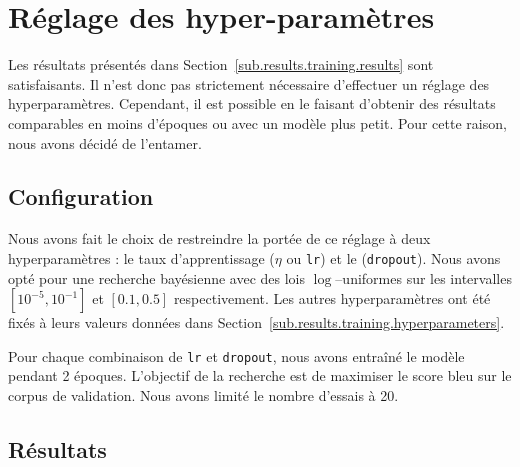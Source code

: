 \section{Réglage des hyper-paramètres}%
\label{sec.results.hparams}

Les résultats présentés dans Section~\ref{sub.results.training.results} sont satisfaisants.
Il n'est donc pas strictement nécessaire d'effectuer un réglage des hyperparamètres.
Cependant, il est possible en le faisant d'obtenir des résultats comparables 
en moins d'époques ou avec un modèle plus petit.
Pour cette raison, nous avons décidé de l'entamer.

\subsection{Configuration}%
\label{sub.results.hparams.config}

Nous avons fait le choix de restreindre la portée de ce réglage à deux hyperparamètres :
le taux d'apprentissage (\(\eta\) ou \verb|lr|) et le (\verb|dropout|).
Nous avons opté pour une recherche bayésienne avec des lois \(\log\)--uniformes sur les intervalles
\(\left[10^{-5}, 10^{-1}\right]\) et \([0.1, 0.5]\) respectivement.
Les autres hyperparamètres ont été fixés à leurs valeurs données dans Section~\ref{sub.results.training.hyperparameters}.

Pour chaque combinaison de \verb|lr| et \verb|dropout|, nous avons entraîné le modèle pendant 2 époques.
L'objectif de la recherche est de maximiser le score \gls{bleu} sur le corpus de validation.
Nous avons limité le nombre d'essais à 20.

\subsection{Résultats}%
\label{sub.results.hparams.results}

